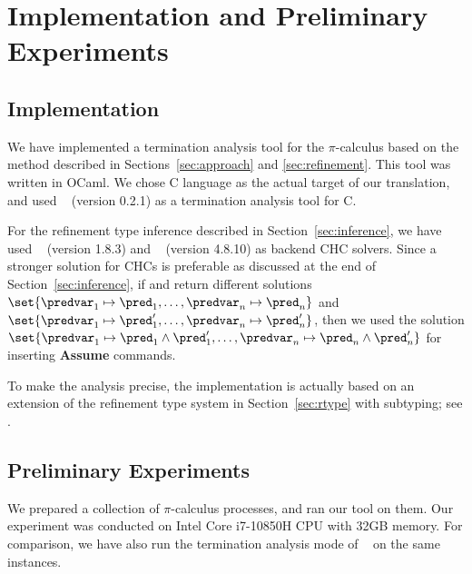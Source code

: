 \section{Implementation and Preliminary Experiments}  \label{sec:implementation}





\subsection{Implementation}
We have implemented a termination analysis tool for the $\pi$-calculus based on the method
described in Sections~\ref{sec:approach} and \ref{sec:refinement}.
This tool was written in OCaml. We chose C language as the actual target of our translation,
and used \ult{}~\cite{heizmann2016ultimate} (version 0.2.1) as a termination analysis tool for C.

For the refinement type inference described in Section~\ref{sec:inference},
we have used
\hoice{}~\cite{DBLP:journals/jar/ChampionCKS20} (version 1.8.3)
and \zthree{}~\cite{de2008z3} (version 4.8.10) as backend CHC solvers.
Since a stronger solution for CHCs is preferable as discussed at the end of
Section~\ref{sec:inference}, if \hoice{} and \zthree{} return
different solutions
\(\set{\predvar_1\mapsto \pred_1,\ldots,\predvar_n\mapsto \pred_n}\)
and 
\(\set{\predvar_1\mapsto \pred'_1,\ldots,\predvar_n\mapsto \pred'_n}\),
then we used the solution
\(\set{\predvar_1\mapsto \pred_1\land \pred'_1,\ldots,\predvar_n\mapsto \pred_n\land \pred'_n}\)
for inserting \textbf{Assume} commands.

To make the analysis precise, the implementation is actually based on an extension of
the refinement type system in Section~\ref{sec:rtype} with subtyping; 
see .

\subsection{Preliminary Experiments}
\label{sec:experiments}

We prepared a collection of $\pi$-calculus processes,
and ran our tool on them.
Our experiment was conducted on Intel Core i7-10850H CPU with 32GB memory.
For comparison, we have also run the termination analysis mode of
\typical{}~\cite{TyPiCal,KobayashiHybrid} on the same instances.

